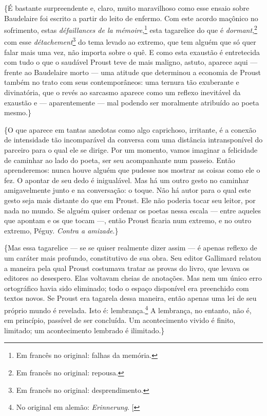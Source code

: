 \{É bastante surpreendente e, claro, muito maravilhoso como esse ensaio
sobre Baudelaire foi escrito a partir do leito de enfermo. Com este
acordo maçônico no sofrimento, estas \emph{défaillances de la mémoire},\footnote{Em francês no original: falhas da memória. \versal{[N.~T.]}} esta
tagarelice do que é \emph{dormant},\footnote{Em francês no
  original: repousa. \versal{[N.~T.]}} com esse \emph{détachement}\footnote{Em francês no original: desprendimento. \versal{[N.~T.]}} do tema levado ao
extremo, que tem alguém que só quer falar mais uma vez, não importa
sobre o quê. E como esta exaustão é entretecida com tudo o que o
saudável Proust teve de mais maligno, astuto, aparece aqui --- frente ao
Baudelaire morto --- uma atitude que determinou a economia de Proust
também no trato com seus contemporâneos: uma ternura tão exuberante e
divinatória, que o revés ao sarcasmo aparece como um reflexo inevitável
da exaustão e --- aparentemente --- mal podendo ser moralmente atribuído ao poeta mesmo.\}

\{O que aparece em tantas anedotas como algo caprichoso, irritante, é a
conexão de intensidade tão incomparável da conversa com uma distância
intransponível do parceiro para o qual ele se dirige. Por um
momento, vamos imaginar a felicidade de caminhar ao lado do poeta, ser seu acompanhante num
passeio. Então aprenderemos: nunca houve alguém que pudesse nos
mostrar as coisas como ele o fez. O apontar de seu dedo é inigualável. Mas
há um outro gesto no caminhar amigavelmente junto e na conversação: o
toque. Não há autor para o qual este gesto seja mais distante do que em
Proust. Ele não poderia tocar seu leitor, por nada no mundo. Se alguém
quiser ordenar os poetas nessa escala --- entre aqueles que apontam e os
que tocam ---, então Proust ficaria num extremo, e no outro extremo,
Péguy. \emph{Contra a amizade}.\}

\{Mas essa tagarelice --- se se quiser realmente dizer assim --- é apenas
reflexo de um caráter mais profundo, constitutivo de sua obra. Seu
editor Gallimard relatou a maneira pela qual Proust costumava tratar
as provas do livro, que levava os editores ao desespero. Elas voltavam
cheias de anotações. Mas nem um único erro ortográfico havia sido
eliminado; todo o espaço disponível era preenchido com textos novos. Se
Proust era tagarela dessa maneira, então apenas uma lei de seu próprio
mundo é revelada. Isto é: lembrança.\footnote{No original em alemão: \emph{Erinnerung}. {[}\versal{N.~T.}{]}} A lembrança, no entanto, não é, em
princípio, passível de ser concluída. Um acontecimento vivido é finito,
limitado; um acontecimento lembrado é ilimitado.\}

